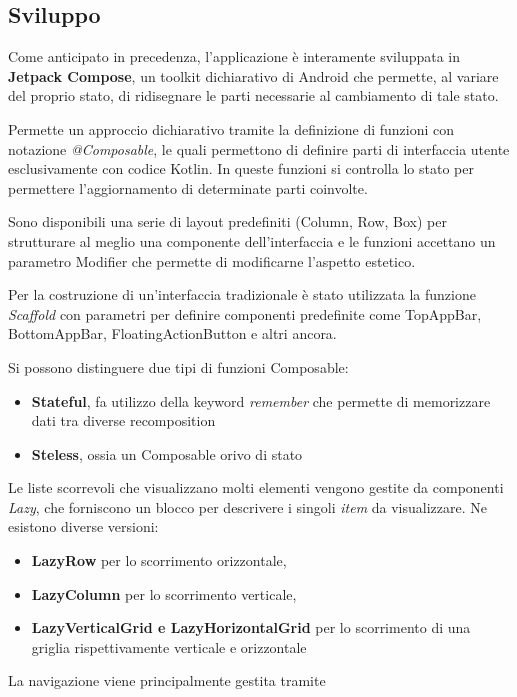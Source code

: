 \documentclass{article}
\begin{document}
\subsection{Sviluppo}
Come anticipato in precedenza, l'applicazione è interamente sviluppata in \textbf{Jetpack Compose}, un toolkit dichiarativo di Android che permette, al variare del proprio stato, di ridisegnare le parti necessarie al cambiamento di tale stato.

Permette un approccio dichiarativo tramite la definizione di funzioni con notazione \textit{@Composable}, le quali permettono di definire parti di interfaccia utente esclusivamente con codice Kotlin. 
In queste funzioni si controlla lo stato per permettere l'aggiornamento di determinate parti coinvolte.

Sono disponibili una serie di layout predefiniti (Column, Row, Box) per strutturare al meglio una componente dell'interfaccia e le funzioni accettano un parametro Modifier che permette di modificarne l'aspetto estetico.

Per la costruzione di un'interfaccia tradizionale è stato utilizzata la funzione \textit{Scaffold} con parametri per definire componenti predefinite come TopAppBar, BottomAppBar, FloatingActionButton e altri ancora.

Si possono distinguere due tipi di funzioni Composable:
\begin{itemize}
  \item \textbf{Stateful}, fa utilizzo della keyword \textit{remember} che permette di memorizzare dati tra diverse recomposition
  \item \textbf{Steless}, ossia un Composable orivo di stato
\end{itemize}

Le liste scorrevoli che visualizzano molti elementi vengono gestite da componenti \textit{Lazy}, che forniscono un blocco per descrivere i singoli \textit{item} da visualizzare.  
Ne esistono diverse versioni:
\begin{itemize}
  \item \textbf{LazyRow} per lo scorrimento orizzontale,
  \item \textbf{LazyColumn} per lo scorrimento verticale,
  \item \textbf{LazyVerticalGrid e LazyHorizontalGrid} per lo scorrimento di una griglia rispettivamente verticale e orizzontale
\end{itemize}

La navigazione viene principalmente gestita tramite 
\end{document}
